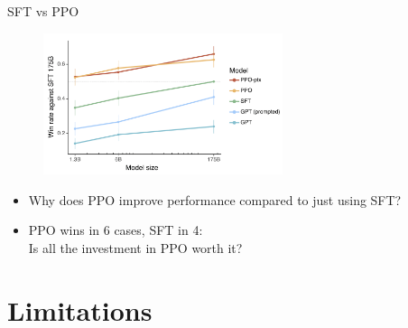 \begin{vbframe}{SFT vs PPO}

\vfill

\begin{figure}
\centering
\includegraphics[width = 7cm]{figure/mainresult.png}
\end{figure}

\begin{itemize}
        \item \ques Why does PPO improve performance compared to
        just using SFT?
        \item \ques PPO wins in 6 cases, SFT in 4:\\ Is all the
        investment in PPO worth it?
\end{itemize}

\vfill

\end{vbframe}





\section{Limitations}











